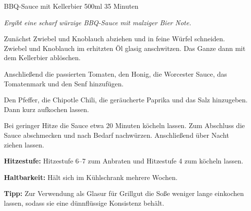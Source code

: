 \begin{recipe}{BBQ-Sauce mit Kellerbier} {500ml} {35 Minuten}

\freeform
\textit{Ergibt eine scharf würzige BBQ-Sauce mit malziger Bier Note.}


Zunächst Zwiebel und Knoblauch abziehen und in feine Würfel schneiden.
Zwiebel und Knoblauch im erhitzten Öl glasig anschwitzen.
Das Ganze dann mit dem Kellerbier ablöschen.


Anschließend die passierten Tomaten, den Honig, die Worcester Sauce, das Tomatenmark und den Senf hinzufügen.


Den Pfeffer, die Chipotle Chili, die geräucherte Paprika und das Salz hinzugeben.
Dann kurz aufkochen lassen.

\newstep
Bei geringer Hitze die Sauce etwa 20 Minuten köcheln lassen.
Zum Abschluss die Sauce abschmecken und nach Bedarf nachwürzen.
Anschließend über Nacht ziehen lassen.

\freeform
\hrulefill

\freeform
\textbf{Hitzestufe:}
Hitzestufe 6--7 zum Anbraten und Hitzestufe 4 zum köcheln lassen.

\freeform
\textbf{Haltbarkeit:}
Hält sich im Kühlschrank mehrere Wochen.

\freeform
\textbf{Tipp:}
Zur Verwendung als Glasur für Grillgut die Soße weniger lange einkochen lassen, sodass sie eine dünnflüssige Konsistenz behält.

\end{recipe}
